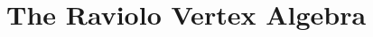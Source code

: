 \documentclass[11pt]{amsart}
\newcommand{\fG}{\mathfrak{G}}
\numberwithin{equation}{section}
\numberwithin{figure}{section}
\numberwithin{table}{section}
\theoremstyle{thm}
\numberwithin{equation}{subsection}
\theoremstyle{definition}
\theoremstyle{rem}
\begin{document}






\section{The Raviolo Vertex Algebra}
\label{sec:vertexalgebra}
\end{document}
